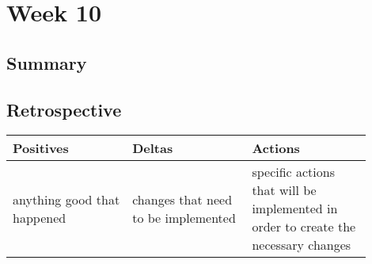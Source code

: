 \documentclass[letterpaper,10pt,serif,draftclsnofoot,onecolumn,compsoc,titlepage]{IEEEtran}
\begin{document}
\section{Week 10}

\subsection{Summary}


\subsection{Retrospective}


\begin{tabular}{|p{0.3\linewidth}|p{0.3\linewidth}|p{0.3\linewidth}|}
   \hline
   \textbf{Positives} & \textbf{Deltas} & \textbf{Actions}\\ 
   \hline
   anything good that happened & changes that need to be implemented & specific actions that will be implemented in order to create the necessary changes \\
   \hline
\end{tabular}





\nocite{*}
\end{document}

